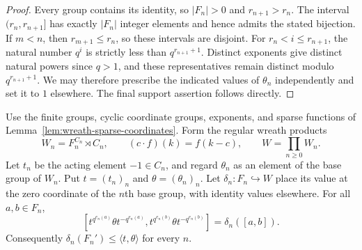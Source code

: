 \begin{proof}
Every group contains its identity, so $|F_n|>0$ and
$r_{n+1}>r_n$. The interval $(r_n,r_{n+1}]$ has exactly
$|F_n|$ integer elements and hence admits the stated bijection.
If $m<n$, then $r_{m+1}\le r_n$, so these intervals are disjoint.
For $r_n<i\le r_{n+1}$, the natural number $q^i$ is strictly
less than $q^{r_{n+1}+1}$. Distinct exponents give distinct
natural powers since $q>1$, and these representatives remain
distinct modulo $q^{r_{n+1}+1}$. We may therefore prescribe
the indicated values of $\theta_n$ independently and set it
to $1$ elsewhere. The final support assertion follows directly.
\end{proof}

\begin{lemma}
\label{lem:wreath-isolated-commutators}
\leanok
Use the finite groups, cyclic coordinate groups, exponents, and
sparse functions of Lemma~\ref{lem:wreath-sparse-coordinates}.
Form the regular wreath products
\[
 W_n=F_n^{C_n}\rtimes C_n,
 \qquad(c\cdot f)(k)=f(k-c),
 \qquad W=\prod_{n\ge0}W_n.
\]
Let $t_n$ be the acting element $-1\in C_n$, and regard $\theta_n$
as an element of the base group of $W_n$. Put
$t=(t_n)_n$ and $\theta=(\theta_n)_n$.
Let $\delta_n:F_n\hookrightarrow W$ place its value at the zero
coordinate of the $n$th base group, with identity values elsewhere.
For all $a,b\in F_n$,
\[
 [t^{q^{e_n(a)}}\theta t^{-q^{e_n(a)}},
   t^{q^{e_n(b)}}\theta t^{-q^{e_n(b)}}]
   =\delta_n([a,b]).
\]
Consequently $\delta_n(F_n')\le\langle t,\theta\rangle$ for every $n$.
\end{lemma}

